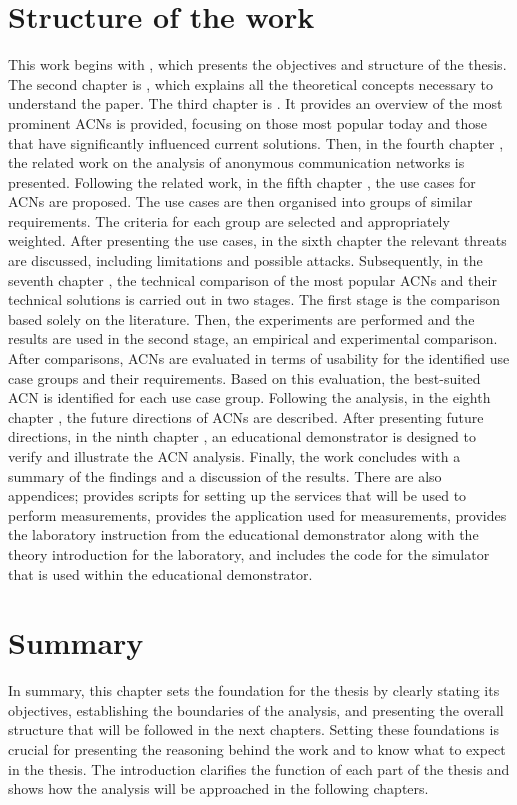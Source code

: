 \section{Structure of the work}
This work begins with , which presents the objectives and structure of the thesis.
The second chapter is , which explains all the theoretical concepts necessary to understand the paper.
The third chapter is . It provides an overview of the most prominent ACNs is provided, focusing on those most popular today and those that have significantly influenced current solutions.
Then, in the fourth chapter , the related work on the analysis of anonymous communication networks is presented.
Following the related work, in the fifth chapter , the use cases for ACNs are proposed. The use cases are then organised into groups of similar requirements. The criteria for each group are selected and appropriately weighted.
After presenting the use cases, in the sixth chapter  the relevant threats are discussed, including limitations and possible attacks.
Subsequently, in the seventh chapter , the technical comparison of the most popular ACNs and their technical solutions is carried out in two stages. The first stage is the comparison based solely on the literature. Then, the experiments are performed and the results are used in the second stage, an empirical and experimental comparison.
After comparisons, ACNs are evaluated in terms of usability for the identified use case groups and their requirements. Based on this evaluation, the best-suited ACN is identified for each use case group.
Following the analysis, in the eighth chapter , the future directions of ACNs are described.
After presenting future directions, in the ninth chapter , an educational demonstrator is designed to verify and illustrate the ACN analysis.
Finally, the work concludes with  a summary of the findings and a discussion of the results.
There are also appendices;  provides scripts for setting up the services that will be used to perform measurements,  provides the application used for measurements,  provides the laboratory instruction from the educational demonstrator along with the theory introduction for the laboratory, and  includes the code for the simulator that is used within the educational demonstrator.

\section{Summary}
In summary, this chapter sets the foundation for the thesis by clearly stating its objectives, establishing the boundaries of the analysis, and presenting the overall structure that will be followed in the next chapters. Setting these foundations is crucial for presenting the reasoning behind the work and to know what to expect in the thesis. The introduction clarifies the function of each part of the thesis and shows how the analysis will be approached in the following chapters.
